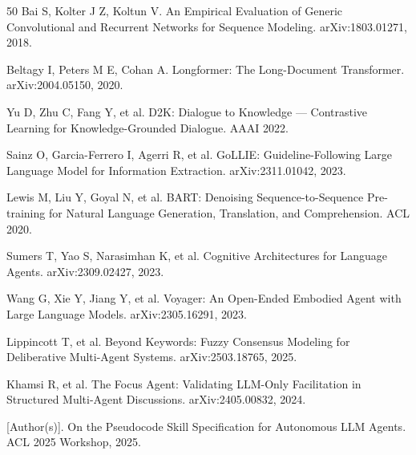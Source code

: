\documentclass[twocolumn,10.5pt]{ctexart}
\begin{document}
\begin{thebibliography}{50}
Bai S, Kolter J Z, Koltun V.
\newblock An Empirical Evaluation of Generic Convolutional and Recurrent Networks for Sequence Modeling.
\newblock arXiv:1803.01271, 2018.

Beltagy I, Peters M E, Cohan A.
\newblock Longformer: The Long-Document Transformer.
\newblock arXiv:2004.05150, 2020.

Yu D, Zhu C, Fang Y, et al.
\newblock D2K: Dialogue to Knowledge — Contrastive Learning for Knowledge-Grounded Dialogue.
\newblock AAAI 2022.

Sainz O, Garcia-Ferrero I, Agerri R, et al.
\newblock GoLLIE: Guideline-Following Large Language Model for Information Extraction.
\newblock arXiv:2311.01042, 2023.

Lewis M, Liu Y, Goyal N, et al.
\newblock BART: Denoising Sequence-to-Sequence Pre-training for Natural Language Generation, Translation, and Comprehension.
\newblock ACL 2020.

Sumers T, Yao S, Narasimhan K, et al.
\newblock Cognitive Architectures for Language Agents.
\newblock arXiv:2309.02427, 2023.

Wang G, Xie Y, Jiang Y, et al.
\newblock Voyager: An Open-Ended Embodied Agent with Large Language Models.
\newblock arXiv:2305.16291, 2023.

Lippincott T, et al.
\newblock Beyond Keywords: Fuzzy Consensus Modeling for Deliberative Multi-Agent Systems.
\newblock arXiv:2503.18765, 2025.

Khamsi R, et al.
\newblock The Focus Agent: Validating LLM-Only Facilitation in Structured Multi-Agent Discussions.
\newblock arXiv:2405.00832, 2024.

[Author(s)].
\newblock On the Pseudocode Skill Specification for Autonomous LLM Agents.
\newblock ACL 2025 Workshop, 2025.

\end{thebibliography}
\end{document}
